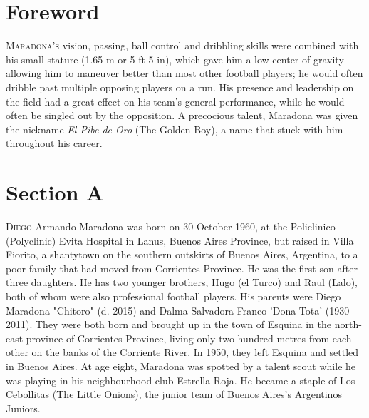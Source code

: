 \documentclass[oneside]{article}
\begin{document}
\begin{multicols*}{2} %



\section{Foreword}

\lettrine{M}{aradona's} vision, passing, ball control and dribbling skills were combined with his small stature (1.65 m or 5 ft 5 in), which gave him a low center of gravity allowing him to maneuver better than most other football players; he would often dribble past multiple opposing players on a run. His presence and leadership on the field had a great effect on his team's general performance, while he would often be singled out by the opposition. A precocious talent, Maradona was given the nickname \emph{El Pibe de Oro} (The Golden Boy), a name that stuck with him throughout his career.






\section{Section A}

\lettrine{D}{iego} Armando Maradona was born on 30 October 1960, at the Policlinico (Polyclinic) Evita Hospital in Lanus, Buenos Aires Province, but raised in Villa Fiorito, a shantytown on the southern outskirts of Buenos Aires, Argentina, to a poor family that had moved from Corrientes Province. He was the first son after three daughters. He has two younger brothers, Hugo (el Turco) and Raul (Lalo), both of whom were also professional football players. His parents were Diego Maradona "Chitoro" (d. 2015) and Dalma Salvadora Franco 'Dona Tota' (1930-2011). They were both born and brought up in the town of Esquina in the north-east province of Corrientes Province, living only two hundred metres from each other on the banks of the Corriente River. In 1950, they left Esquina and settled in Buenos Aires. At age eight, Maradona was spotted by a talent scout while he was playing in his neighbourhood club Estrella Roja. He became a staple of Los Cebollitas (The Little Onions), the junior team of Buenos Aires's Argentinos Juniors. 


\end{multicols*}
\end{document}
